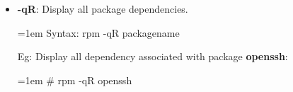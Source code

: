 \begin{flushleft}
\begin{itemize}
		\bigskip
		\bigskip
		\item \textbf{-qR}: Display all package dependencies.
		\bigskip
		\begin{tcolorbox}[breakable,notitle,boxrule=-0pt,colback=pink,colframe=pink]
			\color{black}
			\font=1em
			Syntax: rpm -qR packagename
			\font=4pt
		\end{tcolorbox}
		Eg: Display all dependency associated with package \textbf{openssh}:
		\bigskip
		\begin{tcolorbox}[breakable,notitle,boxrule=-0pt,colback=black,colframe=black]
			\color{white}
			\font=1em
			\color{green}
			\# rpm -qR openssh
			\font=4pt
		\end{tcolorbox}


		
	
	\end{itemize}
\end{flushleft}
\newpage


